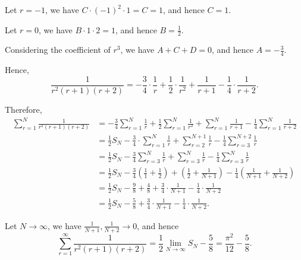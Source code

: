 \begin{enumerate}
          Let \(r = -1\), we have \(C \cdot (-1)^2 \cdot 1 = C = 1\), and hence \(C = 1\).

          Let \(r = 0\), we have \(B \cdot 1 \cdot 2 = 1\), and hence \(B = \frac{1}{2}\).

          Considering the coefficient of \(r^3\), we have \(A + C + D = 0\), and hence \(A = - \frac{3}{4}\).

          Hence,
          \[
              \frac{1}{r^2 (r + 1) (r + 2)} = - \frac{3}{4} \cdot \frac{1}{r} + \frac{1}{2} \cdot \frac{1}{r^2} + \frac{1}{r + 1} - \frac{1}{4} \cdot \frac{1}{r + 2}.
          \]

          Therefore,
          \begin{align*}
              \sum_{r = 1}^{N} \frac{1}{r^2 (r + 1) (r + 2)} & = - \frac{3}{4} \sum_{r = 1}^{N} \frac{1}{r} + \frac{1}{2} \sum_{r = 1}^{N} \frac{1}{r^2} + \sum_{r = 1}^{N} \frac{1}{r + 1} - \frac{1}{4} \sum_{r = 1}^{N} \frac{1}{r + 2}        \\
                                                             & = \frac{1}{2} S_{N} - \frac{3}{4} \cdot \sum_{r = 1}^{N} \frac{1}{r} + \sum_{r = 2}^{N + 1} \frac{1}{r} - \frac{1}{4} \sum_{r = 3}^{N + 2} \frac{1}{r}                             \\
                                                             & = \frac{1}{2} S_{N} - \frac{3}{4} \sum_{r = 3}^{N} \frac{1}{r} + \sum_{r = 3}^{N} \frac{1}{r} - \frac{1}{4} \sum_{r = 3}^{N} \frac{1}{r}                                           \\
                                                             & = \frac{1}{2} S_{N} - \frac{3}{4} \left(\frac{1}{1} + \frac{1}{2}\right) + \left(\frac{1}{2} + \frac{1}{N + 1}\right) - \frac{1}{4} \left(\frac{1}{N + 1} + \frac{1}{N + 2}\right) \\
                                                             & = \frac{1}{2} S_{N} - \frac{9}{8} + \frac{4}{8} + \frac{3}{4} \cdot \frac{1}{N + 1} - \frac{1}{4} \cdot \frac{1}{N + 2}                                                            \\
                                                             & = \frac{1}{2} S_{N} - \frac{5}{8} + \frac{3}{4} \cdot \frac{1}{N + 1} - \frac{1}{4} \cdot \frac{1}{N + 2}.
          \end{align*}

          Let \(N \to \infty\), we have \(\frac{1}{N + 1}, \frac{1}{N + 2} \to 0\), and hence
          \[
              \sum_{r = 1}^{\infty} \frac{1}{r^2 (r + 1) (r + 2)} = \frac{1}{2} \lim_{N \to \infty} S_{N} - \frac{5}{8} = \frac{\pi^2}{12} - \frac{5}{8}.
          \]


\end{enumerate}
